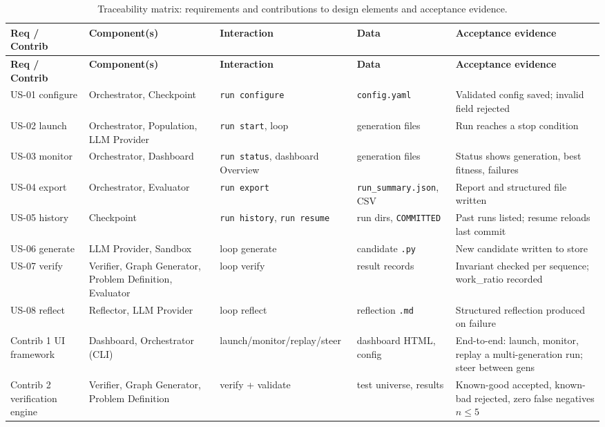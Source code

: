 \documentclass[12pt,a4paper]{article}
\begin{document}
\begin{longtable}{|p{2.7cm}|p{3.1cm}|p{2.9cm}|p{2.9cm}|p{3.2cm}|}
\caption{Traceability matrix: requirements and contributions to design elements and acceptance evidence.}
\label{tab:trace} \\
\hline
\textbf{Req / Contrib} & \textbf{Component(s)} & \textbf{Interaction} & \textbf{Data} & \textbf{Acceptance evidence} \\
\hline
\endfirsthead
\hline
\textbf{Req / Contrib} & \textbf{Component(s)} & \textbf{Interaction} & \textbf{Data} & \textbf{Acceptance evidence} \\
\hline
\endhead
\hline
\endfoot

US-01 configure & Orchestrator, Checkpoint & \texttt{run configure} & \texttt{config.yaml} & Validated config saved; invalid field rejected \\
\hline
US-02 launch & Orchestrator, Population, LLM Provider & \texttt{run start}, loop & generation files & Run reaches a stop condition \\
\hline
US-03 monitor & Orchestrator, Dashboard & \texttt{run status}, dashboard Overview & generation files & Status shows generation, best fitness, failures \\
\hline
US-04 export & Orchestrator, Evaluator & \texttt{run export} & \texttt{run\_summary.json}, CSV & Report and structured file written \\
\hline
US-05 history & Checkpoint & \texttt{run history}, \texttt{run resume} & run dirs, \texttt{COMMITTED} & Past runs listed; resume reloads last commit \\
\hline
US-06 generate & LLM Provider, Sandbox & loop generate & candidate \texttt{.py} & New candidate written to store \\
\hline
US-07 verify & Verifier, Graph Generator, Problem Definition, Evaluator & loop verify & result records & Invariant checked per sequence; work\_ratio recorded \\
\hline
US-08 reflect & Reflector, LLM Provider & loop reflect & reflection \texttt{.md} & Structured reflection produced on failure \\
\hline
Contrib 1 UI framework & Dashboard, Orchestrator (CLI) & launch/monitor/replay/steer & dashboard HTML, config & End-to-end: launch, monitor, replay a multi-generation run; steer between gens \\
\hline
Contrib 2 verification engine & Verifier, Graph Generator, Problem Definition & verify + validate & test universe, results & Known-good accepted, known-bad rejected, zero false negatives $n \le 5$ \\

\end{longtable}
\end{document}
